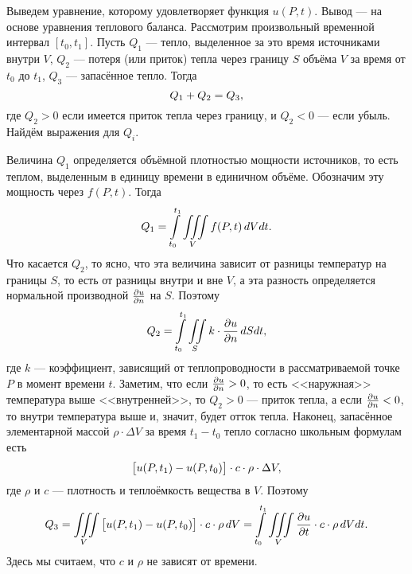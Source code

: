 Выведем уравнение, которому удовлетворяет функция $u(P,t)$. Вывод --- на основе уравнения теплового баланса. Рассмотрим произвольный временной интервал $[t_0,t_1]$. Пусть $Q_1$ --- тепло, выделенное за это время источниками внутри $V$, $Q_2$ --- потеря (или приток) тепла через границу $S$ объёма $V$ за время от $t_0$ до $t_1$, $Q_3$ --- запасённое тепло. Тогда 
\begin{equation}\label{l18:eq:16}
	\hfill Q_1+Q_2=Q_3,\hfill
\end{equation}
где $Q_2>0$ если имеется приток тепла через границу, и $Q_2<0$ --- если убыль. Найдём выражения для $Q_i$.

Величина $Q_1$ определяется объёмной плотностью мощности источников, то есть теплом, выделенным в единицу времени в единичном объёме. Обозначим эту мощность через $f(P,t)$. Тогда 
\begin{equation}\label{l18:eq:17}
	\hfill Q_1=\int\limits_{t_0}^{t_1}\iiint\limits_{V} f(P,t)\,dVdt. \hfill
\end{equation}
Что касается $Q_2$, то ясно, что эта величина зависит от разницы температур на границы $S$, то есть от разницы внутри и вне $V$, а эта разность определяется нормальной производной $\frac{\partial u}{\partial n}$ на $S$. Поэтому
\begin{equation}\label{l18:eq:18}
	\hfill Q_2=\int\limits_{t_0}^{t_1}\iint\limits_{S} k\cdot\pder{u}{n}\,dSdt, \hfill
\end{equation}
где $k$ --- коэффициент, зависящий от теплопроводности в рассматриваемой точке $P$ в момент времени $t$. Заметим, что если $\frac{\partial u}{\partial n}>0$, то есть <<наружная>> температура выше <<внутренней>>, то $Q_2>0$ --- приток тепла, а если $\frac{\partial u}{\partial n}<0$, то внутри температура выше и, значит, будет отток тепла. Наконец, запасённое элементарной массой $\rho\cdot\Delta V$ за время $t_1-t_0$ тепло согласно школьным формулам есть
\begin{equation*}
	\hfill \big[u(P,t_1)-u(P,t_0)\big]\cdot c\cdot\rho\cdot\Delta V,\hfill
\end{equation*} 
где $\rho$ и $c$ --- плотность и теплоёмкость вещества в $V$. Поэтому 
\begin{equation}\label{l18:eq:19}
	\hfill Q_3=\iiint\limits_{V}\big[u(P,t_1)-u(P,t_0)\big]\cdot c\cdot\rho\,dV=\int\limits_{t_0}^{t_1}\iiint\limits_{V}\pder{u}{t}\cdot c\cdot\rho\,dVdt.\hfill
\end{equation}
Здесь мы считаем, что $c$ и $\rho$ не зависят от времени. 

